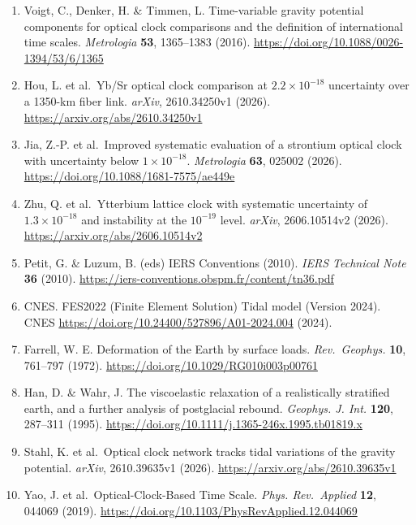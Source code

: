 \documentclass[
  10pt,
  a4paper,
]{article}
\begin{document}
\begin{enumerate}
  requirements of optical clock networks for validating
  satellite-derived time-variable gravity data. \emph{Geophys. J. Int.}
  \textbf{226}, 764--779 (2021).
  \url{https://academic.oup.com/gji/article/226/2/764/6212226}
\item
  Voigt, C., Denker, H. \& Timmen, L. Time-variable gravity potential
  components for optical clock comparisons and the definition of
  international time scales. \emph{Metrologia} \textbf{53}, 1365--1383
  (2016). \url{https://doi.org/10.1088/0026-1394/53/6/1365}
\item
  Hou, L. et al.~Yb/Sr optical clock comparison at \(2.2\times10^{-18}\)
  uncertainty over a 1350-km fiber link. \emph{arXiv}, 2610.34250v1
  (2026). \url{https://arxiv.org/abs/2610.34250v1}
\item
  Jia, Z.-P. et al.~Improved systematic evaluation of a strontium
  optical clock with uncertainty below \(1\times10^{-18}\).
  \emph{Metrologia} \textbf{63}, 025002 (2026).
  \url{https://doi.org/10.1088/1681-7575/ae449e}
\item
  Zhu, Q. et al.~Ytterbium lattice clock with systematic uncertainty of
  \(1.3\times 10^{-18}\) and instability at the \(10^{-19}\) level.
  \emph{arXiv}, 2606.10514v2 (2026).
  \url{https://arxiv.org/abs/2606.10514v2}
\item
  Petit, G. \& Luzum, B. (eds) IERS Conventions (2010). \emph{IERS
  Technical Note} \textbf{36} (2010).
  \url{https://iers-conventions.obspm.fr/content/tn36.pdf}
\item
  CNES. FES2022 (Finite Element Solution) Tidal model (Version 2024).
  CNES \url{https://doi.org/10.24400/527896/A01-2024.004} (2024).
\item
  Farrell, W. E. Deformation of the Earth by surface loads.
  \emph{Rev.~Geophys.} \textbf{10}, 761--797 (1972).
  \url{https://doi.org/10.1029/RG010i003p00761}
\item
  Han, D. \& Wahr, J. The viscoelastic relaxation of a realistically
  stratified earth, and a further analysis of postglacial rebound.
  \emph{Geophys. J. Int.} \textbf{120}, 287--311 (1995).
  \url{https://doi.org/10.1111/j.1365-246x.1995.tb01819.x}
\item
  Stahl, K. et al.~Optical clock network tracks tidal variations of the
  gravity potential. \emph{arXiv}, 2610.39635v1 (2026).
  \url{https://arxiv.org/abs/2610.39635v1}
\item
  Yao, J. et al.~Optical-Clock-Based Time Scale. \emph{Phys.
  Rev.~Applied} \textbf{12}, 044069 (2019).
  \url{https://doi.org/10.1103/PhysRevApplied.12.044069}

\end{enumerate}
\end{document}
